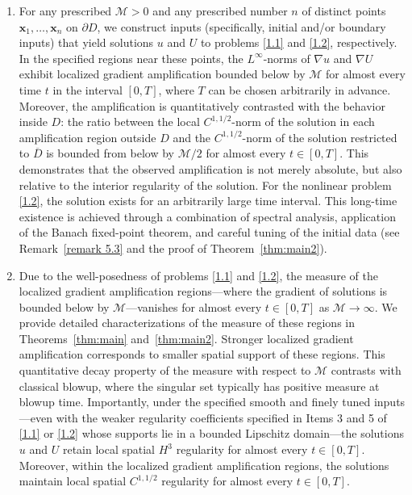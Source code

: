 \documentclass[11pt,reqno,oneside]{amsart}
\numberwithin{equation}{section}
\theoremstyle{definition}
\theoremstyle{remark}
\numberwithin{equation}{section}
\begin{document}
	\begin{enumerate}
		\renewcommand{\labelenumi}{(\roman{enumi})}
		\item 
		For any prescribed $\mathcal{M} > 0$ and any prescribed number $n$ of distinct points $\mathbf{x}_1, \dots, \mathbf{x}_n$ on $\partial D$, we construct inputs (specifically, initial and/or boundary inputs) that yield solutions $u$ and $U$ to problems \eqref{1.1} and \eqref{1.2}, respectively. In the specified regions near these points, the $L^\infty$-norms of $\nabla u$ and $\nabla U$ exhibit localized gradient amplification bounded below by $\mathcal{M}$ for almost every time $t$ in the interval $[0, T]$, where $T$ can be chosen arbitrarily in advance. 	Moreover, the amplification is quantitatively contrasted with the behavior inside \(D\): the ratio between the local \(C^{1,1/2}\)-norm of the solution in each amplification region outside \(D\) and the \(C^{1,1/2}\)-norm of the solution restricted to \(\overline{D}\) is bounded from below by \(\mathcal{M}/2\) for almost every \(t \in [0,T]\). This demonstrates that the observed amplification is not merely absolute, but also relative to the interior regularity of the solution. For the nonlinear problem \eqref{1.2}, the solution exists for an arbitrarily large time interval. This long-time existence is achieved through a combination of spectral analysis, application of the Banach fixed-point theorem, and careful tuning of the initial data (see Remark~\ref{remark 5.3} and the proof of Theorem~\ref{thm:main2}).
		
		\item 
		Due to the well-posedness of problems \eqref{1.1} and \eqref{1.2}, the measure of the localized gradient amplification regions—where the gradient of solutions is bounded below by $\mathcal{M}$—vanishes for almost every $t \in [0,T]$ as $\mathcal{M} \to \infty$. We provide detailed characterizations of the measure of these regions in Theorems~\ref{thm:main} and~\ref{thm:main2}. Stronger localized gradient amplification corresponds to smaller spatial support of these regions. This quantitative decay property of the measure with respect to $\mathcal{M}$ contrasts with classical blowup, where the singular set typically has positive measure at blowup time. Importantly, under the specified smooth and finely tuned inputs—even with the weaker regularity coefficients specified in Items 3 and 5 of \eqref{1.1} or \eqref{1.2} whose supports lie in a bounded Lipschitz domain—the solutions $u$ and $U$ retain local spatial $H^3$ regularity for almost every $t \in [0,T]$. Moreover, within the localized gradient amplification regions, the solutions maintain local spatial $C^{1,1/2}$ regularity for almost every $t \in [0,T]$.
	\end{enumerate} 
	
\end{document}
